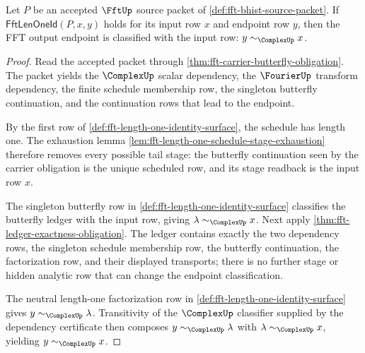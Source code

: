 \begin{theorem}
\label{thm:fft-length-one-schedule-input-classifier}
Let $P$ be an accepted $\FftUp$ source packet of \autoref{def:fft-bhist-source-packet}. If $\mathsf{FftLenOneId}(P,x,y)$ holds for its input row $x$ and endpoint row $y$, then the FFT output endpoint is classified with the input row:
$y\sim_{\ComplexUp}x$.
\end{theorem}
\begin{proof}
Read the accepted packet through \autoref{thm:fft-carrier-butterfly-obligation}. The packet yields the $\ComplexUp$ scalar dependency, the $\FourierUp$ transform dependency, the finite schedule membership row, the singleton butterfly continuation, and the continuation rows that lead to the endpoint.

By the first row of \autoref{def:fft-length-one-identity-surface}, the schedule has length one. The exhaustion lemma \autoref{lem:fft-length-one-schedule-stage-exhaustion} therefore removes every possible tail stage: the butterfly continuation seen by the carrier obligation is the unique scheduled row, and its stage readback is the input row $x$.

The singleton butterfly row in \autoref{def:fft-length-one-identity-surface} classifies the butterfly ledger with the input row, giving $\lambda\sim_{\ComplexUp}x$. Next apply \autoref{thm:fft-ledger-exactness-obligation}. The ledger contains exactly the two dependency rows, the singleton schedule membership row, the butterfly continuation, the factorization row, and their displayed transports; there is no further stage or hidden analytic row that can change the endpoint classification.

The neutral length-one factorization row in \autoref{def:fft-length-one-identity-surface} gives $y\sim_{\ComplexUp}\lambda$. Transitivity of the $\ComplexUp$ classifier supplied by the dependency certificate then composes $y\sim_{\ComplexUp}\lambda$ with $\lambda\sim_{\ComplexUp}x$, yielding $y\sim_{\ComplexUp}x$.
\end{proof}
